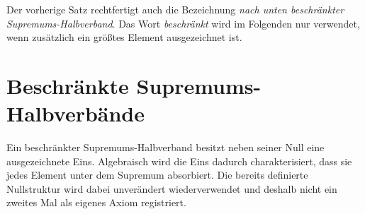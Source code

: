 \documentclass[main.tex]{subfiles}
\begin{document}
\leavevmode\par\medskip

\begin{tabproof}
\end{tabproof}

\begin{remark}
Der vorherige Satz rechtfertigt auch die Bezeichnung
\emph{nach unten beschränkter Supremums-Halbverband}. Das Wort
\emph{beschränkt} wird im Folgenden nur verwendet, wenn zusätzlich ein
größtes Element ausgezeichnet ist.
\end{remark}

\section{Beschränkte Supremums-Halbverbände}

Ein beschränkter Supremums-Halbverband besitzt neben seiner Null eine
ausgezeichnete Eins. Algebraisch wird die Eins dadurch charakterisiert, dass
sie jedes Element unter dem Supremum absorbiert.
Die bereits definierte Nullstruktur wird dabei unverändert wiederverwendet
und deshalb nicht ein zweites Mal als eigenes Axiom registriert.

\par\smallskip

\end{document}

